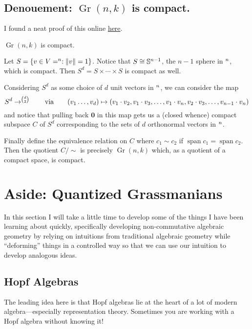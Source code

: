 \documentclass[12pt]{article}
\DeclareMathOperator{\Gr}{Gr}
\let\k\relax
\newcommand{\k}{\mathbbm{k}}
\begin{document}
\subsection{Denouement: \texorpdfstring{$\Gr(n,k)$}{Gr(n,k)} is compact.}
I found a neat proof of this online \href{https://math.stackexchange.com/questions/148088/compactness-of-the-grassmannian}{here}.
\begin{prop}
	$\Gr(n,k)$ is compact.
\end{prop}
\begin{prf}
	Let $S=\{v\in V=\k^n: \|v\|=1\}$. Notice that $S\cong \mathbb{S}^{n-1}$, the $n-1$ sphere in $\k^n$, which is compact. Then $S^d=S\times \cdots\times S$ is compact as well.

	Considering $S^d$ as some choice of $d$ unit vectors in $\k^n$, we can consider the map 
	\[S^d\to\k^{\binom{d}{2}}\qquad\text{via}\qquad (v_1\dots,v_d)\mapsto (v_1\cdot v_2,v_1\cdot v_3,\dots,v_1\cdot v_n,v_2\cdot v_3,\dots,v_{n-1}\cdot v_n)\]
	and notice that pulling back $\mathbf 0$ in this map gets us a (closed whence) compact subspace $C$ of $S^d$ corresponding to the 
	sets of $d$ orthonormal vectors in $\k^n$.

	Finally define the equivalence relation on $C$ where $c_1\sim c_2$ if $\operatorname{span} c_1=\operatorname{span} c_2$. Then the quotient 
	$C/\sim$ is precisely $\Gr(n,k)$ which, as a quotient of a compact space, is compact.
\end{prf}

\section{Aside: Quantized Grassmanians}
In this section I will take a little time to develop some of the things I have been learning about quickly,
specifically developing non-commutative algebraic geometry by relying on intuitions from traditional algebraic geometry 
while ``deforming'' things in a controlled way so that we can use our intuition to develop analogous ideas.

\subsection{Hopf Algebras}
The leading idea here is that Hopf algebras lie at the heart of a lot of modern algebra---especially representation theory. Sometimes you are working with 
a Hopf algebra without knowing it!
\end{document}
